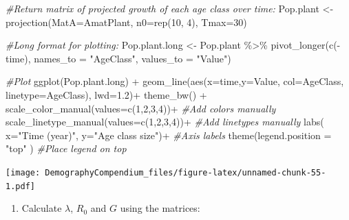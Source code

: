 \documentclass[
]{book}
\newenvironment{Shaded}{\begin{snugshade}}{\end{snugshade}}
\newcommand{\AttributeTok}[1]{\textcolor[rgb]{0.77,0.63,0.00}{#1}}
\newcommand{\CommentTok}[1]{\textcolor[rgb]{0.56,0.35,0.01}{\textit{#1}}}
\newcommand{\DecValTok}[1]{\textcolor[rgb]{0.00,0.00,0.81}{#1}}
\newcommand{\FloatTok}[1]{\textcolor[rgb]{0.00,0.00,0.81}{#1}}
\newcommand{\FunctionTok}[1]{\textcolor[rgb]{0.00,0.00,0.00}{#1}}
\newcommand{\NormalTok}[1]{#1}
\newcommand{\OtherTok}[1]{\textcolor[rgb]{0.56,0.35,0.01}{#1}}
\newcommand{\SpecialCharTok}[1]{\textcolor[rgb]{0.00,0.00,0.00}{#1}}
\newcommand{\StringTok}[1]{\textcolor[rgb]{0.31,0.60,0.02}{#1}}
\providecommand{\tightlist}{%
  \setlength{\itemsep}{0pt}\setlength{\parskip}{0pt}}
\begin{document}
\begin{Shaded}
\begin{Highlighting}[]
\CommentTok{\#Return matrix of projected growth of each age class over time:}
\NormalTok{Pop.plant }\OtherTok{\textless{}{-}} \FunctionTok{projection}\NormalTok{(}\AttributeTok{MatA=}\NormalTok{AmatPlant, }\AttributeTok{n0=}\FunctionTok{rep}\NormalTok{(}\DecValTok{10}\NormalTok{, }\DecValTok{4}\NormalTok{), }\AttributeTok{Tmax=}\DecValTok{30}\NormalTok{)}
 
\CommentTok{\#Long format for plotting:}
\NormalTok{Pop.plant.long }\OtherTok{\textless{}{-}}\NormalTok{ Pop.plant }\SpecialCharTok{\%\textgreater{}\%} \FunctionTok{pivot\_longer}\NormalTok{(}\FunctionTok{c}\NormalTok{(}\SpecialCharTok{{-}}\NormalTok{time),}
               \AttributeTok{names\_to =} \StringTok{"AgeClass"}\NormalTok{, }\AttributeTok{values\_to =} \StringTok{"Value"}\NormalTok{)}

\CommentTok{\#Plot}
\FunctionTok{ggplot}\NormalTok{(Pop.plant.long) }\SpecialCharTok{+} 
  \FunctionTok{geom\_line}\NormalTok{(}\FunctionTok{aes}\NormalTok{(}\AttributeTok{x=}\NormalTok{time,}\AttributeTok{y=}\NormalTok{Value, }\AttributeTok{col=}\NormalTok{AgeClass, }\AttributeTok{linetype=}\NormalTok{AgeClass), }\AttributeTok{lwd=}\FloatTok{1.2}\NormalTok{)}\SpecialCharTok{+}
  \FunctionTok{theme\_bw}\NormalTok{() }\SpecialCharTok{+}
  \FunctionTok{scale\_color\_manual}\NormalTok{(}\AttributeTok{values=}\FunctionTok{c}\NormalTok{(}\DecValTok{1}\NormalTok{,}\DecValTok{2}\NormalTok{,}\DecValTok{3}\NormalTok{,}\DecValTok{4}\NormalTok{))}\SpecialCharTok{+} \CommentTok{\#Add colors manually}
  \FunctionTok{scale\_linetype\_manual}\NormalTok{(}\AttributeTok{values=}\FunctionTok{c}\NormalTok{(}\DecValTok{1}\NormalTok{,}\DecValTok{2}\NormalTok{,}\DecValTok{3}\NormalTok{,}\DecValTok{4}\NormalTok{))}\SpecialCharTok{+} \CommentTok{\#Add linetypes manually}
  \FunctionTok{labs}\NormalTok{( }\AttributeTok{x=}\StringTok{"Time (year)"}\NormalTok{, }\AttributeTok{y=}\StringTok{"Age class size"}\NormalTok{)}\SpecialCharTok{+} \CommentTok{\#Axis labels}
  \FunctionTok{theme}\NormalTok{(}\AttributeTok{legend.position =} \StringTok{"top"}\NormalTok{ ) }\CommentTok{\#Place legend on top}
\end{Highlighting}
\end{Shaded}

\texttt{[image: DemographyCompendium\_files/figure-latex/unnamed-chunk-55-1.pdf]}

\begin{enumerate}
\def\labelenumi{\arabic{enumi}.}
\setcounter{enumi}{4}
\tightlist
\item
  Calculate \(\lambda\), \(R_0\) and \(G\) using the matrices:
\end{enumerate}
\end{document}

